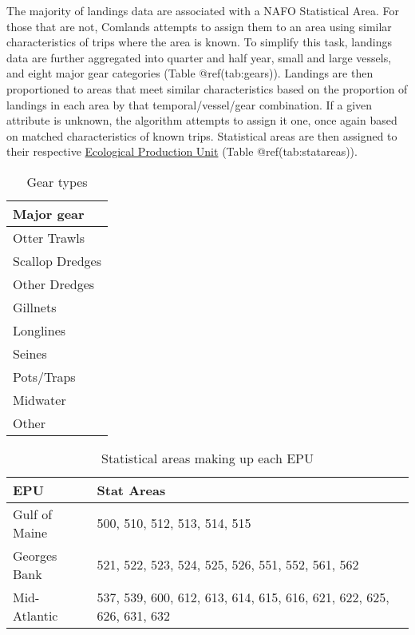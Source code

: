 \documentclass[]{article}
\begin{document}
The majority of landings data are associated with a NAFO Statistical
Area. For those that are not, Comlands attempts to assign them to an
area using similar characteristics of trips where the area is known. To
simplify this task, landings data are further aggregated into quarter
and half year, small and large vessels, and eight major gear categories
(Table @ref(tab:gears)). Landings are then proportioned to areas that
meet similar characteristics based on the proportion of landings in each
area by that temporal/vessel/gear combination. If a given attribute is
unknown, the algorithm attempts to assign it one, once again based on
matched characteristics of known trips. Statistical areas are then
assigned to their respective \protect\hyperlink{epu}{Ecological
Production Unit} (Table @ref(tab:statareas)).

\begin{table}[t]

\caption{\label{tab:gears}Gear types}
\centering
\begin{tabular}{l}
\hline
Major gear\\
\hline
Otter Trawls\\
\hline
Scallop Dredges\\
\hline
Other Dredges\\
\hline
Gillnets\\
\hline
Longlines\\
\hline
Seines\\
\hline
Pots/Traps\\
\hline
Midwater\\
\hline
Other\\
\hline
\end{tabular}
\end{table}

\begin{table}[t]

\caption{\label{tab:statareas}Statistical areas making up each EPU}
\centering
\begin{tabular}{l|l}
\hline
EPU & Stat Areas\\
\hline
Gulf of Maine & 500, 510, 512, 513, 514, 515\\
\hline
Georges Bank & 521, 522, 523, 524, 525, 526, 551, 552, 561, 562\\
\hline
Mid-Atlantic & 537, 539, 600, 612, 613, 614, 615, 616, 621, 622, 625, 626, 631, 632\\
\hline
\end{tabular}
\end{table}
\end{document}
